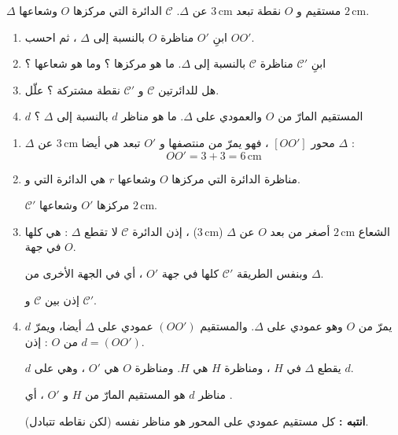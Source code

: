 \documentclass[12pt,a4paper]{article}
\newcommand{\cm}{\,\mathrm{cm}}
\begin{document}
\begin{corr}[title={مناظرة دائرة ومستقيم}, stars=2, source={Axiomaths}]
$\Delta$ مستقيم و $O$ نقطة تبعد $3\cm$ عن $\Delta$. $\mathcal{C}$ الدائرة التي مركزها $O$ وشعاعها $2\cm$.
\begin{enumerate}
  \item ابنِ $O'$ مناظرة $O$ بالنسبة إلى $\Delta$ ، ثم احسب $OO'$.
  \item ابنِ $\mathcal{C}'$ مناظرة $\mathcal{C}$ بالنسبة إلى $\Delta$. ما هو مركزها ؟ وما هو شعاعها ؟
  \item هل للدائرتين $\mathcal{C}$ و $\mathcal{C}'$ نقطة مشتركة ؟ علّل.
  \item $d$ المستقيم المارّ من $O$ والعمودي على $\Delta$. ما هو مناظر $d$ بالنسبة إلى $\Delta$ ؟
\end{enumerate}
\axsol
\begin{enumerate}[itemsep=14pt]
  \item $\Delta$ محور $[OO']$ ، فهو يمرّ من منتصفها و $O'$ تبعد هي أيضا $3\cm$ عن $\Delta$ :
  \[OO'=3+3=6\cm\]
  \item\leavevmode
  \begin{prop}
  مناظرة الدائرة التي مركزها $O$ وشعاعها $r$ هي الدائرة التي  و.
  \end{prop}
  $\mathcal{C}'$ مركزها $O'$ وشعاعها $2\cm$.
  \begin{center}
  \end{center}
  \item الشعاع $2\cm$ أصغر من بعد $O$ عن $\Delta$ ($3\cm$) ، إذن الدائرة $\mathcal{C}$ لا تقطع $\Delta$ : هي كلها في جهة $O$.

  وبنفس الطريقة $\mathcal{C}'$ كلها في جهة $O'$ ، أي في الجهة الأخرى من $\Delta$.

  إذن  بين $\mathcal{C}$ و $\mathcal{C}'$.
  \item $d$ يمرّ من $O$ وهو عمودي على $\Delta$. والمستقيم $(OO')$ عمودي على $\Delta$ أيضا، ويمرّ من $O$ : إذن $d=(OO')$.

  $d$ يقطع $\Delta$ في $H$ ، ومناظرة $H$ هي $H$. ومناظرة $O$ هي $O'$ ، وهي على $d$.

  مناظر $d$ هو المستقيم المارّ من $H$ و $O'$ ، أي .

  \textbf{انتبه :} كل مستقيم عمودي على المحور هو مناظر نفسه (لكن نقاطه تتبادل).
\end{enumerate}
\end{corr}
\end{document}
